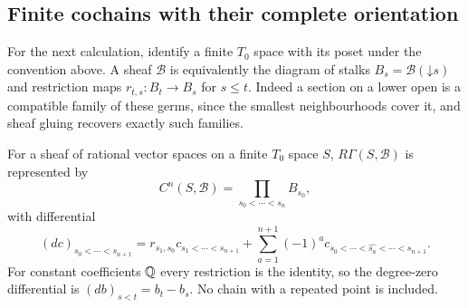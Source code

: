 \subsection{Finite cochains with their complete orientation}

For the next calculation, identify a finite $T_0$ space with its poset
under the convention above. A sheaf $\mathcal B$ is equivalently the
diagram of stalks $B_s=\mathcal B(\mathord\downarrow s)$ and restriction
maps $r_{t,s}:B_t\to B_s$ for $s\le t$. Indeed a section on a lower
open is a compatible family of these germs, since the smallest
neighbourhoods cover it, and sheaf gluing recovers exactly such families.

\begin{theorem}\label{FL:thm:finite-cochains}
For a sheaf of rational vector spaces on a finite $T_0$ space $S$,
$R\Gamma(S,\mathcal B)$ is represented by
\[
 C^n(S,\mathcal B)=\prod_{s_0<\cdots<s_n}B_{s_0},
 \tag{FL14}\label{FL:eq:cochains}
\]
with differential
\[
 (dc)_{s_0<\cdots<s_{n+1}}
 =r_{s_1,s_0}c_{s_1<\cdots<s_{n+1}}
   +\sum_{a=1}^{n+1}(-1)^a
       c_{s_0<\cdots<\widehat{s_a}<\cdots<s_{n+1}}.
 \tag{FL15}\label{FL:eq:cochain-differential}
\]
For constant coefficients $\mathbb Q$ every restriction is the identity,
so the degree-zero differential is
$(db)_{s<t}=b_t-b_s$. No chain with a repeated point is included.
\end{theorem}
